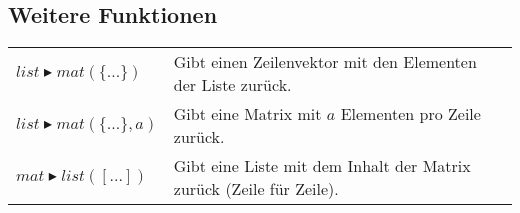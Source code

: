 \subsection{Weitere Funktionen}
\begin{tabular}{|l|l|}
	\hline
	$list \blacktriangleright mat(\{...\})$			& Gibt einen Zeilenvektor mit den Elementen der Liste zurück. \\
	$list \blacktriangleright mat(\{...\},a)$		& Gibt eine Matrix mit $a$ Elementen pro Zeile zurück.\\ \hline
	$mat \blacktriangleright list([...])$			& Gibt eine Liste mit dem Inhalt der Matrix zurück (Zeile für Zeile). \\ \hline
\end{tabular}
